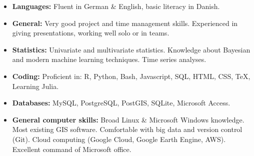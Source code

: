 \documentclass[12pt,a4paper,roman]{moderncv}        %
\begin{document}
\begin{itemize}

\item \textbf{Languages:} Fluent in German \& English, basic literacy in Danish.
\item \textbf{General:} Very good project and time management skills. Experienced in giving presentations, working well solo or in teams.
\item \textbf{Statistics:} Univariate and multivariate statistics. Knowledge about Bayesian and modern machine learning techniques. Time series analyses.
\item \textbf{Coding:} Proficient in: R, Python, Bash, Javascript, SQL, HTML, CSS, TeX, Learning Julia.
\item \textbf{Databases:} MySQL, PostgreSQL, PostGIS, SQLite, Microsoft Access.
\item \textbf{General computer skills:} Broad Linux \& Microsoft Windows knowledge. Most existing GIS software. Comfortable with big data and version control (Git). Cloud computing (Google Cloud, Google Earth Engine, AWS). Excellent command of Microsoft office.

\end{itemize}


\end{document}
